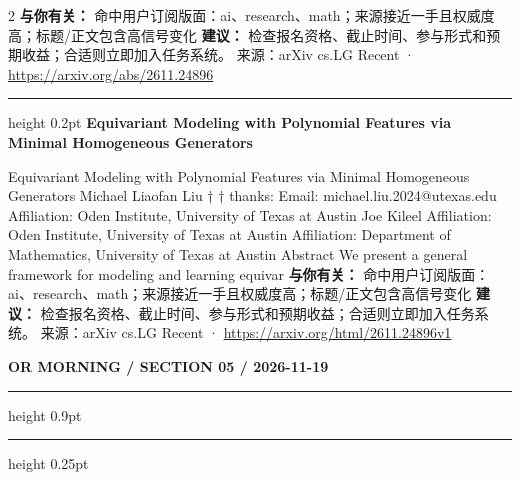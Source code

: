 \documentclass[10.5pt]{ctexart}
\begin{document}
\begin{multicols}{2}
\textbf{与你有关：} 命中用户订阅版面：ai、research、math；来源接近一手且权威度高；标题/正文包含高信号变化
\textbf{建议：} 检查报名资格、截止时间、参与形式和预期收益；合适则立即加入任务系统。
{\footnotesize\color{ormuted} 来源：arXiv cs.LG Recent · \url{https://arxiv.org/abs/2611.24896}}
\vspace{2mm}
\hrule height 0.2pt
\vspace{2mm}
{\large\bfseries Equivariant Modeling with Polynomial Features via Minimal Homogeneous Generators}\par
Equivariant Modeling with Polynomial Features via Minimal Homogeneous Generators Michael Liaofan Liu † † thanks: Email: michael.liu.2024@utexas.edu Affiliation: Oden Institute, University of Texas at Austin Joe Kileel Affiliation: Oden Institute, University of Texas at Austin Affiliation: Department of Mathematics, University of Texas at Austin Abstract We present a general framework for modeling and learning equivar
\textbf{与你有关：} 命中用户订阅版面：ai、research、math；来源接近一手且权威度高；标题/正文包含高信号变化
\textbf{建议：} 检查报名资格、截止时间、参与形式和预期收益；合适则立即加入任务系统。
{\footnotesize\color{ormuted} 来源：arXiv cs.LG Recent · \url{https://arxiv.org/html/2611.24896v1}}
\end{multicols}
\newpage
{\small\bfseries OR MORNING / SECTION 05 / 2026-11-19}
\vspace{2mm}
\hrule height 0.9pt
\vspace{1.5mm}
\hrule height 0.25pt
\vspace{4mm}
\end{document}

